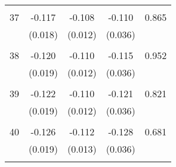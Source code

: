 \begin{tabular}{l*{1}{cccc}}
 & & & &\\
  37       & -0.117 & -0.108 & -0.110 & 0.865 \\
          & (0.018) & (0.012) & (0.036) & \\
 & & & &\\
  38       & -0.120 & -0.110 & -0.115 & 0.952 \\
          & (0.019) & (0.012) & (0.036) & \\
 & & & &\\
  39       & -0.122 & -0.110 & -0.121 & 0.821 \\
          & (0.019) & (0.012) & (0.036) & \\
 & & & &\\
  40       & -0.126 & -0.112 & -0.128 & 0.681 \\
          & (0.019) & (0.013) & (0.036) & \\
 & & & &\\
\hline\hline
\end{tabular}
